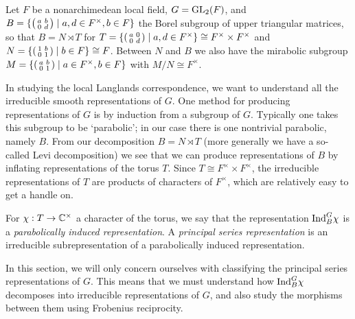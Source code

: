 

Let $F$ be a nonarchimedean local field, $G=\mathrm{GL}_2(F)$, and $B=\{\begin{psmallmatrix} a&b\\0&d\end{psmallmatrix} \mid a,d \in F^\times, b \in F\}$ the Borel subgroup of upper triangular matrices, so that $B=N \rtimes T$ for $T=\{\begin{psmallmatrix}
    a&0\\0&d
\end{psmallmatrix}\mid a,d \in F^\times\} \cong F^\times \times F^\times$ and $N=\{\begin{psmallmatrix}
    1&b\\0&1
\end{psmallmatrix}\mid b \in F\}\cong F$. Between $N$ and $B$ we also have the mirabolic subgroup $M=\{\begin{psmallmatrix}
    a&b\\0&1
\end{psmallmatrix} \mid a\in F^\times, b \in F\}$ with $M/N \cong F^\times$.

In studying the local Langlands correspondence, we want to understand all the irreducible smooth representations of $G$. One method for producing representations of $G$ is by induction from a subgroup of $G$. Typically one takes this subgroup to be `parabolic'; in our case there is one nontrivial parabolic, namely $B$. From our decomposition $B=N \rtimes T$ (more generally we have a so-called Levi decomposition) we see that we can produce representations of $B$ by inflating representations of the torus $T$. Since $T \cong F^\times \times F^\times$, the irreducible representations of $T$ are products of characters of $F^\times$, which are relatively easy to get a handle on.

\begin{defn}
    For $\chi:T \to \mathbb{C}^\times$ a character of the torus, we say that the representation $\mathrm{Ind}_B^G \chi$ is a \textit{parabolically induced representation}. A \textit{principal series representation} is an irreducible subrepresentation of a parabolically induced representation.
\end{defn}

In this section, we will only concern ourselves with classifying the principal series representations of $G$. This means that we must understand how $\mathrm{Ind}_B^G \chi$ decomposes into irreducible representations of $G$, and also study the morphisms between them using Frobenius reciprocity.

